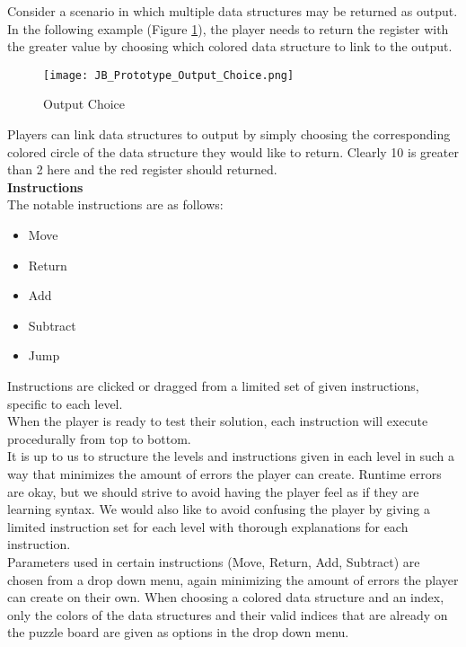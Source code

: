 Consider a scenario in which multiple data structures may be returned as output.
In the following example (Figure \ref{fig:Output_Choice}), the player needs to return the register
with the greater value by choosing which colored data structure to link to the output.

\begin{figure}[!hb]
  \caption{Output Choice}
  \label{fig:Output_Choice}
  \centering
  \texttt{[image: JB\_Prototype\_Output\_Choice.png]}
\end{figure}

Players can link data structures to output by simply choosing the corresponding colored
circle of the data structure they would like to return. Clearly 10 is greater than 2 here and
the red register should returned.\\

\textbf{Instructions}\\

The notable instructions are as follows:

\begin{itemize}
  \item Move
  \item Return
  \item Add
  \item Subtract
  \item Jump
\end{itemize}

Instructions are clicked or dragged from a limited set of given instructions, 
specific to each level.\\

When the player is ready to test their solution, each instruction will execute
procedurally from top to bottom.\\

It is up to us to structure the levels and instructions given in each level in such
a way that minimizes the amount of errors the player can create. Runtime errors
are okay, but we should strive to avoid having the player feel as if they are learning
syntax. We would also like to avoid confusing the player by giving a limited
instruction set for each level with thorough explanations for each instruction.\\

Parameters used in certain instructions (Move, Return, Add, Subtract) are chosen
from a drop down menu, again minimizing the amount of errors the player can create
on their own. When choosing a colored data structure and an index, only the colors of
the data structures and their valid indices that are already on the puzzle board
are given as options in the drop down menu.\\
\newpage

